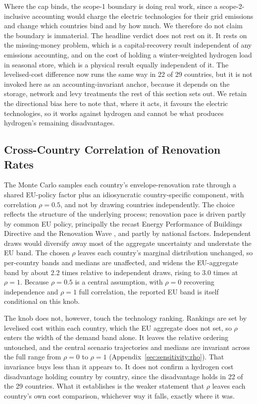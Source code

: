 Where the cap binds, the scope-1 boundary is doing real work, since a scope-2-inclusive
accounting would charge the electric technologies for their grid emissions and change
which countries bind and by how much. We therefore do
not claim the boundary is immaterial. The headline verdict does not rest on it. It rests on the missing-money problem, which is a capital-recovery result independent of
any emissions accounting, and on the cost of holding a winter-weighted hydrogen load in
seasonal store, which is a physical result equally independent of it. The levelised-cost
difference now runs the same way in 22 of 29 countries, but it is not invoked here as an
accounting-invariant anchor, because it depends on the storage, network and levy
treatments the rest of this section sets out. We retain the directional bias here to
note that, where it acts, it favours the electric technologies, so it works against
hydrogen and cannot be what produces hydrogen's remaining disadvantages.

\subsection{Cross-Country Correlation of Renovation Rates}
The Monte Carlo samples each country's envelope-renovation rate through a shared
EU-policy factor plus an idiosyncratic country-specific component, with correlation
$\rho=0.5$, and not by drawing countries independently. The choice reflects the
structure of the underlying process; renovation pace is driven partly by common EU
policy, principally the recast Energy Performance of Buildings Directive and the
Renovation Wave \citep{EPBD2024}, and partly by national factors. Independent draws
would diversify away most of the aggregate uncertainty and understate the EU band. The
chosen $\rho$ leaves each country's marginal distribution unchanged, so per-country
bands and medians are unaffected, and widens the EU-aggregate band by about 2.2 times
relative to independent draws, rising to 3.0 times at $\rho=1$. Because $\rho=0.5$ is a
central assumption, with $\rho=0$ recovering independence and $\rho=1$ full correlation,
the reported EU band is itself conditional on this knob.

The knob does not, however, touch the technology ranking. Rankings are set by levelised
cost within each country, which the EU aggregate does not set, so $\rho$ enters the width of the demand band alone. It leaves the relative ordering untouched, and the central scenario trajectories and medians are invariant across the full range from $\rho=0$ to $\rho=1$
(Appendix~\ref{sec:sensitivity:rho}). That invariance buys less than it appears to.
It does not confirm a hydrogen cost disadvantage holding country by
country, since the disadvantage holds in 22 of the 29 countries. What it establishes is
the weaker statement that $\rho$ leaves each country's own cost comparison, whichever way
it falls, exactly where it was.

